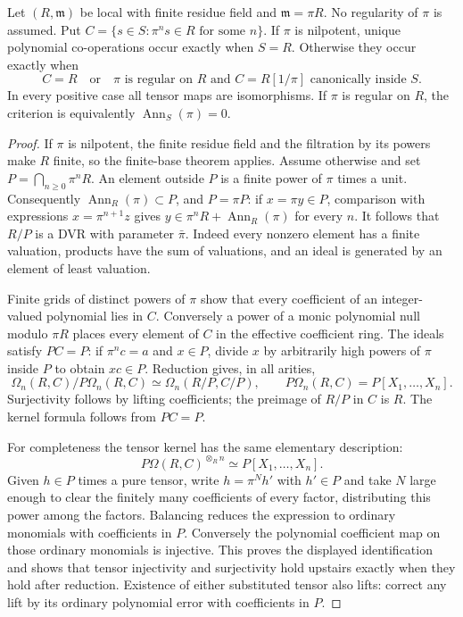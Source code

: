 \begin{theorem}\label{thm:principal-maximal-coefficients}
Let $(R,\mathfrak m)$ be local with finite residue field and
$\mathfrak m=\pi R$. No regularity of $\pi$ is assumed. Put
$C=\{s\in S:\pi^ns\in R\text{ for some }n\}$.
If $\pi$ is nilpotent, unique polynomial co-operations occur
exactly when $S=R$. Otherwise they occur exactly when
\[
 C=R\quad\text{or}\quad
 \pi\text{ is regular on }R\text{ and }C=R[1/\pi]
 \text{ canonically inside }S.
\]
In every positive case all tensor maps are isomorphisms. If $\pi$
is regular on $R$, the criterion is equivalently
$\operatorname{Ann}_S(\pi)=0$.
\end{theorem}
\begin{proof}
If $\pi$ is nilpotent, the finite residue field and the filtration
by its powers make $R$ finite, so the finite-base theorem applies.
Assume otherwise and set $P=\bigcap_{n\ge0}\pi^nR$.
An element outside $P$ is a finite power of $\pi$ times a unit.
Consequently $\operatorname{Ann}_R(\pi)\subset P$, and
$P=\pi P$: if $x=\pi y\in P$, comparison with expressions
$x=\pi^{n+1}z$ gives $y\in\pi^nR+\operatorname{Ann}_R(\pi)$
for every $n$. It follows that $R/P$ is a DVR with parameter
$\bar\pi$. Indeed every nonzero element has a finite valuation,
products have the sum of valuations, and an ideal is generated
by an element of least valuation.

Finite grids of distinct powers of $\pi$ show that every coefficient
of an integer-valued polynomial lies in $C$. Conversely a power
of a monic polynomial null modulo $\pi R$ places every element of
$C$ in the effective coefficient ring. The ideals satisfy $PC=P$:
if $\pi^nc=a$ and $x\in P$, divide $x$ by arbitrarily high powers
of $\pi$ inside $P$ to obtain $xc\in P$. Reduction gives, in all
arities,
\[
 \Omega_n(R,C)/P\Omega_n(R,C)
       \simeq\Omega_n(R/P,C/P),\qquad
 P\Omega_n(R,C)=P[X_1,\ldots,X_n].
\]
Surjectivity follows by lifting coefficients; the preimage of
$R/P$ in $C$ is $R$. The kernel formula follows from $PC=P$.

For completeness the tensor kernel has the same elementary
description:
\[
 P\Omega(R,C)^{\otimes_Rn}\simeq P[X_1,\ldots,X_n].
\]
Given $h\in P$ times a pure tensor, write $h=\pi^Nh'$ with
$h'\in P$ and take $N$ large enough to clear the finitely many
coefficients of every factor, distributing this power among the
factors. Balancing reduces the expression to ordinary monomials
with coefficients in $P$. Conversely the polynomial coefficient
map on those ordinary monomials is injective. This proves the
displayed identification and shows that tensor injectivity and
surjectivity hold upstairs exactly when they hold after reduction.
Existence of either substituted tensor also lifts: correct any
lift by its ordinary polynomial error with coefficients in $P$.


\end{proof}
